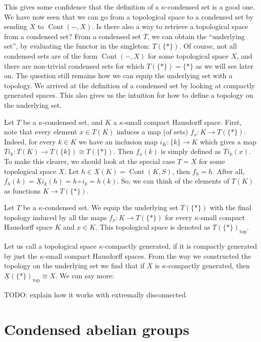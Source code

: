 \documentclass{article}
\DeclareMathOperator{\Cont}{Cont}
\renewcommand{\top}{\textrm{top}}
\begin{document}
This gives some confidence that the definition of a $\kappa$-condensed set
is a good one. We have now seen that we can go from a topological space
to a condensed set by sending $X$ to $\Cont(- ,X)$. Is there also a way
to retrieve a topological space from a condensed set?
From a condensed set $T$, we can obtain the ``underlying set'', by evaluating
the functor in the singleton: $T(\{*\})$. Of course, not all condensed sets
are of the form $\Cont(-, X)$ for some topological space $X$, and there are
non-trivial condensed sets for which $T(\{*\}) = \{*\}$ as we will
see later on. The question still remains how we can equip the underlying
set with a topology. We arrived at the definition of a
condensed set by looking at compactly
generated spaces. This also gives us the intuition for how to
define a topology on the underlying set.

Let $T$ be a $\kappa$-condensed
set, and $K$ a $\kappa$-small compact Hausdorff space. First, note that every
element $x \in T(K)$ induces a map (of sets) $f_x \colon K \to T(\{*\})$. Indeed,
for every $k\in K$ we have an inclusion map $i_K \colon \{k\} \to K$
which gives a map $Ti_k \colon T(K) \to T(\{k\}) \cong T(\{*\})$. Then
$f_x(k)$ is simply defined as $Ti_k(x)$. To make this clearer, we should
look at the special case $T = \underline{X}$ for some topological space
$X$. Let $h\in \underline{X}(K) = \Cont(K , S)$, then $f_h = h$.
After all, $f_h(k) = \underline{X}i_k(h) = h\circ i_k = h(k)$.
So, we can think of the elements of $T(K)$ as functions $K \to T(\{*\})$.
\begin{definition}
    Let $T$ be a $\kappa$-condensed set. We equip the underlying set $T(\{*\})$
    with the final topology induced by all the maps $f_x \colon K \to T(\{*\})$
    for every $\kappa$-small compact Hausdorff space $K$ and $x\in K$.
    This topological space is denoted as $T(\{*\})_\top$.
\end{definition}

Let us call a topological space $\kappa$-compactly generated, if
it is compactly generated by just the $\kappa$-small compact Hausdorff spaces.
From the way we constructed the topology on the underlying set
we find that if $X$ is $\kappa$-compactly generated,
then $\underline{X}(\{*\})_\top \cong X$. We can say more:
\begin{prop}
    \label{prop:compactly_generated_adjunction}

\end{prop}

TODO: explain how it works with extremally disconnected.
\section{Condensed abelian groups}


\end{document}
